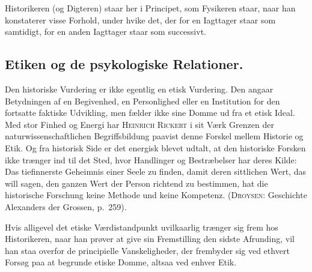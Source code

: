 \documentclass[12pt]{article}
\newcommand{\opage}[1]{\marginnote{\footnotesize\textit{[#1]}}}
\begin{document}
Historikeren (og Digteren) staar her i Principet, som Fysikeren staar,
naar han konstaterer visse Forhold, under hvike det, der for en
Iagttager staar som samtidigt, for en anden Iagttager staar som
successivt.

\subsection{Etiken og de psykologiske Relationer.}\label{sec:4b}
\noindent
Den historiske Vurdering er ikke egentlig en etisk Vurdering. Den angaar
Betydningen af en Begivenhed, en Personlighed eller en Institution for
den fortsatte faktiske Udvikling, men fælder ikke sine Domme ud fra et
etisk Ideal. Med stor Finhed og Energi har \textsc{Heinrich Rickert} i
sit Værk \guillemotright Grenzen der naturwissenschaftlichen
Begriffsbildung\guillemotleft{} paavist denne Forskel mellem Historie og
Etik. Og fra historisk Side er det energisk blevet udtalt, at den
historiske Forsken ikke trænger ind til det Sted, hvor Handlinger og
Bestræbelser har deres Kilde: \guillemotright Das tiefinnerste Geheimnis
einer Seele zu finden, damit deren sittlichen Wert, das will sagen, den
ganzen Wert der Person richtend zu bestimmen, hat die historische
Forschung keine Methode und keine Kompetenz\guillemotleft.
(\textsc{Droysen}: Geschichte Alexanders der Grossen, p.~259).

Hvis alligevel det etiske Værdistandpunkt uvilkaarlig trænger sig frem
hos Historikeren, naar han prøver at give sin Fremstilling den sidste
Afrunding, vil han staa overfor
\opage{82} de principielle Vanskeligheder, der frembyder sig ved ethvert Forsøg paa
at begrunde etiske Domme, altsaa ved enhver Etik.
\end{document}
